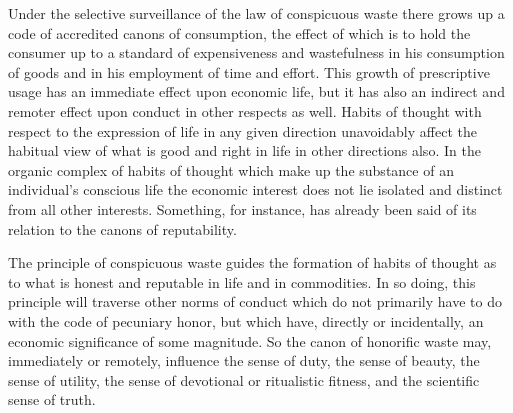 \documentclass[12pt]{report}
\begin{document}
Under the selective surveillance of the law of conspicuous waste there
grows up a code of accredited canons of consumption, the effect of
which is to hold the consumer up to a standard of expensiveness and
wastefulness in his consumption of goods and in his employment of time
and effort. This growth of prescriptive usage has an immediate effect
upon economic life, but it has also an indirect and remoter effect upon
conduct in other respects as well. Habits of thought with respect to
the expression of life in any given direction unavoidably affect the
habitual view of what is good and right in life in other directions
also. In the organic complex of habits of thought which make up the
substance of an individual's conscious life the economic interest does
not lie isolated and distinct from all other interests. Something,
for instance, has already been said of its relation to the canons of
reputability.

The principle of conspicuous waste guides the formation of habits of
thought as to what is honest and reputable in life and in commodities.
In so doing, this principle will traverse other norms of conduct which
do not primarily have to do with the code of pecuniary honor, but
which have, directly or incidentally, an economic significance of some
magnitude. So the canon of honorific waste may, immediately or remotely,
influence the sense of duty, the sense of beauty, the sense of utility,
the sense of devotional or ritualistic fitness, and the scientific sense
of truth.
\end{document}
